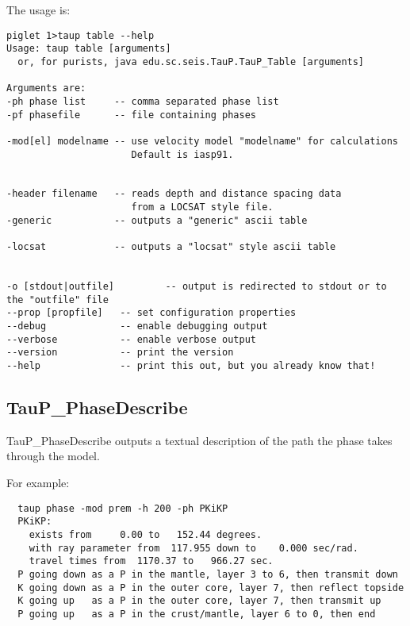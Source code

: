 The usage is:
\begin{verbatim}
piglet 1>taup table --help
Usage: taup table [arguments]
  or, for purists, java edu.sc.seis.TauP.TauP_Table [arguments]

Arguments are:
-ph phase list     -- comma separated phase list
-pf phasefile      -- file containing phases

-mod[el] modelname -- use velocity model "modelname" for calculations
                      Default is iasp91.


-header filename   -- reads depth and distance spacing data
                      from a LOCSAT style file.
-generic           -- outputs a "generic" ascii table

-locsat            -- outputs a "locsat" style ascii table


-o [stdout|outfile]         -- output is redirected to stdout or to the "outfile" file
--prop [propfile]   -- set configuration properties
--debug             -- enable debugging output
--verbose           -- enable verbose output
--version           -- print the version
--help              -- print this out, but you already know that!
\end{verbatim}

\subsection{TauP\_PhaseDescribe}

TauP\_PhaseDescribe outputs a textual description of the path the
phase takes through the model.

For example:
\begin{verbatim}
  taup phase -mod prem -h 200 -ph PKiKP
  PKiKP:
    exists from     0.00 to   152.44 degrees.
    with ray parameter from  117.955 down to    0.000 sec/rad.
    travel times from  1170.37 to   966.27 sec.
  P going down as a P in the mantle, layer 3 to 6, then transmit down
  K going down as a P in the outer core, layer 7, then reflect topside
  K going up   as a P in the outer core, layer 7, then transmit up
  P going up   as a P in the crust/mantle, layer 6 to 0, then end
\end{verbatim}


